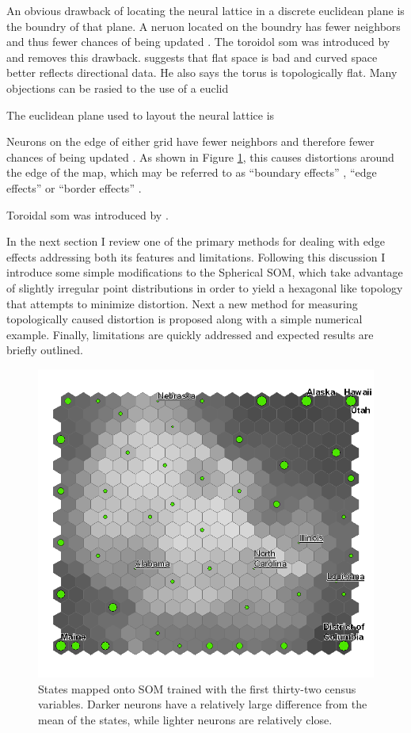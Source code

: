 \documentclass[12pt]{article}
\begin{document}
An obvious drawback of locating the neural lattice in a discrete euclidean plane
is the boundry of that plane.  A neruon located on the boundry has fewer
neighbors and thus fewer chances of being updated \citep{Wu:2006lr}.  The
toroidol som was introduced by \cite{li1993} and removes this drawback.
\cite{ritter99} suggests that flat space is bad and curved space better reflects
directional data.  He also says the torus is topologically flat.
Many objections can be rasied to the use of a euclid

The euclidean plane used to layout the neural lattice is 



Neurons on the edge of either grid have fewer neighbors and therefore fewer
chances of being updated \citep{Wu:2006lr}.  As shown in Figure \ref{figure1},
this causes distortions around the edge of the map, which may be referred to as
``boundary effects'' \citep{ritter99}, ``edge effects'' \citep{boudjemai2003} or
``border effects'' \citep{Wu:2006lr}.

Toroidal som was introduced by \citep{li1993}.


In the next section I review one of the primary methods for dealing with edge
effects addressing both its features and limitations.  Following this
discussion I introduce some simple modifications to the Spherical SOM, which
take advantage of slightly irregular point distributions in order to yield a
hexagonal like topology that attempts to minimize distortion.  Next a new
method for measuring topologically caused distortion is proposed along with a
simple numerical example.  Finally, limitations are quickly addressed and
expected results are briefly outlined.

\begin{figure}
\centering
\includegraphics[width=0.85\linewidth]{gridedge.png}
\caption{States mapped onto SOM trained with the first thirty-two census
variables.  Darker neurons have a relatively large difference from the mean of
the states, while lighter neurons are relatively close.}
\label{figure1}
\end{figure}
\end{document}

